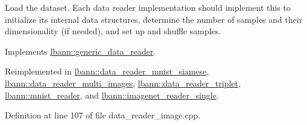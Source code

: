 Load the dataset. Each data reader implementation should implement this to initialize its internal data structures, determine the number of samples and their dimensionality (if needed), and set up and shuffle samples. 

Implements \hyperlink{classlbann_1_1generic__data__reader_afeb47703d988a230a59859cbfc178215}{lbann\+::generic\+\_\+data\+\_\+reader}.



Reimplemented in \hyperlink{classlbann_1_1data__reader__mnist__siamese_a2c60a89c5815fa24b34d4febfecfc3db}{lbann\+::data\+\_\+reader\+\_\+mnist\+\_\+siamese}, \hyperlink{classlbann_1_1data__reader__multi__images_afb8adef1f9ac6723d71ae5afc29b01ec}{lbann\+::data\+\_\+reader\+\_\+multi\+\_\+images}, \hyperlink{classlbann_1_1data__reader__triplet_a2601234d6d501df6170c6fb60dfb873e}{lbann\+::data\+\_\+reader\+\_\+triplet}, \hyperlink{classlbann_1_1mnist__reader_aacbd6c4dec95b9849083d96e0005b392}{lbann\+::mnist\+\_\+reader}, and \hyperlink{classlbann_1_1imagenet__reader__single_a7ea768d9784b7a9532551d7402ee4f8e}{lbann\+::imagenet\+\_\+reader\+\_\+single}.



Definition at line 107 of file data\+\_\+reader\+\_\+image.\+cpp.


